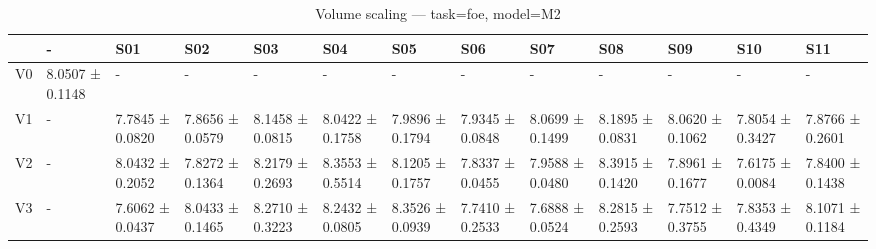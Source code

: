 \begin{table}[htbp]
\centering
\caption{Volume scaling — task=foe, model=M2}
\label{tab:volume:foe:M2}
\begin{tabular}{lllllllllllll}
\toprule
\toprule
 & - & S01 & S02 & S03 & S04 & S05 & S06 & S07 & S08 & S09 & S10 & S11 \\
\midrule
\midrule
V0 & 8.0507 ± 0.1148 & - & - & - & - & - & - & - & - & - & - & - \\
V1 & - & 7.7845 ± 0.0820 & 7.8656 ± 0.0579 & 8.1458 ± 0.0815 & 8.0422 ± 0.1758 & 7.9896 ± 0.1794 & 7.9345 ± 0.0848 & 8.0699 ± 0.1499 & 8.1895 ± 0.0831 & 8.0620 ± 0.1062 & 7.8054 ± 0.3427 & 7.8766 ± 0.2601 \\
V2 & - & 8.0432 ± 0.2052 & 7.8272 ± 0.1364 & 8.2179 ± 0.2693 & 8.3553 ± 0.5514 & 8.1205 ± 0.1757 & 7.8337 ± 0.0455 & 7.9588 ± 0.0480 & 8.3915 ± 0.1420 & 7.8961 ± 0.1677 & 7.6175 ± 0.0084 & 7.8400 ± 0.1438 \\
V3 & - & 7.6062 ± 0.0437 & 8.0433 ± 0.1465 & 8.2710 ± 0.3223 & 8.2432 ± 0.0805 & 8.3526 ± 0.0939 & 7.7410 ± 0.2533 & 7.6888 ± 0.0524 & 8.2815 ± 0.2593 & 7.7512 ± 0.3755 & 7.8353 ± 0.4349 & 8.1071 ± 0.1184 \\
\bottomrule
\end{tabular}\end{table}
